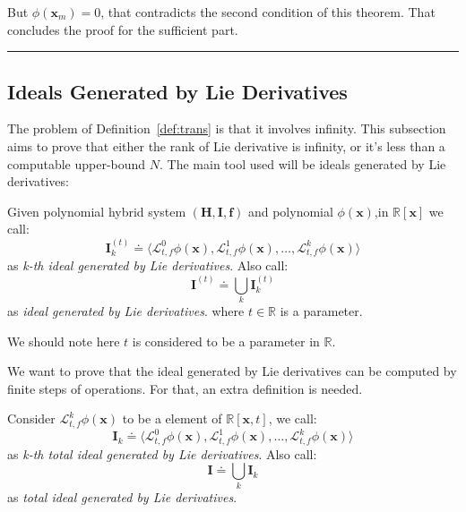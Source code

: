 \documentclass{jssc}
\newcommand{\rulex}{\hfill\rule{1mm}{3mm}}
\begin{document}
But $\phi(\boldsymbol{x}_m) = 0$, that contradicts the second condition of this theorem. That concludes the proof for the sufficient part.
\rulex

\subsection{Ideals Generated by Lie Derivatives}
\label{sub:original}
The problem of Definition~\ref{def:trans} is that it involves infinity. This subsection aims to prove that either the rank of Lie derivative is infinity, or it's less than a computable upper-bound $N$. The main tool used will be ideals generated by Lie derivatives: 

\begin{definition}
\label{def:lieIdeal}
Given polynomial hybrid system $(\boldsymbol{H}, \boldsymbol{I}, \boldsymbol{f})$ and polynomial $\phi(\boldsymbol{x})$,in $\mathbb{R}[\boldsymbol{x}]$ we call: 
		\begin{equation*}
			\boldsymbol{I}_k^{(t)} \doteq \langle \mathcal{L}_{t, f}^0 \phi(\boldsymbol{x}), \mathcal{L}_{t, f}^1 \phi(\boldsymbol{x}), \dots, \mathcal{L}_{t, f}^k \phi(\boldsymbol{x}) \rangle
		\end{equation*}
		as \emph{k-th ideal generated by Lie derivatives}. Also call: 
		\begin{equation*}
			\boldsymbol{I}^{(t)} \doteq \bigcup_k \boldsymbol{I}_k^{(t)}
		\end{equation*}
		as \emph{ideal generated by Lie derivatives}. where $t \in \mathbb{R}$ is a parameter.
\end{definition}
We should note here $t$ is considered to be a parameter in $\mathbb{R}$.

We want to prove that the ideal generated by Lie derivatives can be computed by finite steps of operations. For that, an extra definition is needed. 

\begin{definition}
\label{def:lieTot}
Consider $\mathcal{L}_{t, f}^k \phi(\boldsymbol{x})$ to be a element of $\mathbb{R}[\boldsymbol{x}, t]$, we call: 
	\begin{equation*}
		\boldsymbol{I}_k \doteq \langle \mathcal{L}_{t, f}^0 \phi(\boldsymbol{x}), \mathcal{L}_{t, f}^1 \phi(\boldsymbol{x}), \dots, \mathcal{L}_{t, f}^k \phi(\boldsymbol{x}) \rangle
	\end{equation*}	
	as \emph{k-th total ideal generated by Lie derivatives}. Also call:
	\begin{equation*}
		\boldsymbol{I} \doteq \bigcup_k \boldsymbol{I}_k
	\end{equation*}
	as \emph{total ideal generated by Lie derivatives}.
\end{definition}
\end{document}
